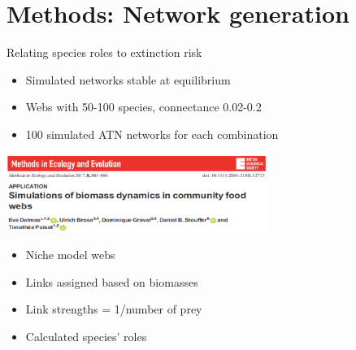 \documentclass{beamer}
\newcommand*\whitem{%
  \item[\color{white}\scalebox{0.9}{\textbullet}]}
\begin{document}
\section*{Methods: Network generation}
  \begin{frame}{Relating species roles to extinction risk}
      \begin{itemize}
        \item Simulated networks stable at equilibrium
        \item Webs with 50-100 species, connectance 0.02-0.2
        \item 100 simulated ATN networks for each combination
      \end{itemize}

      \begin{centering}

      \includegraphics[height=1in]{intro_figs/Delmas2017.eps}

      \end{centering}

      \begin{itemize}
        \whitem {\color{white}Niche model webs}
        \whitem {\color{white}Links assigned based on biomasses}
        \whitem {\color{white}Link strengths = 1/number of prey}
      \end{itemize}

      \begin{itemize}
        \whitem {\color{white}Calculated species' roles}
      \end{itemize}

    \end{frame}
\end{document}
